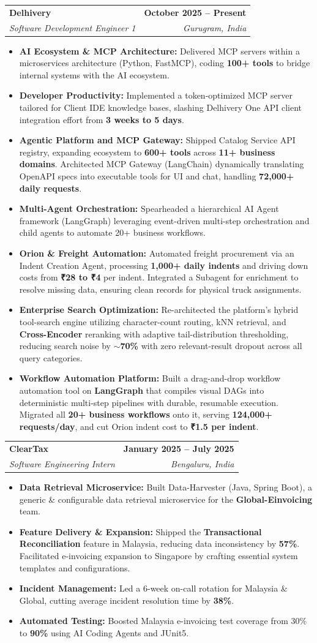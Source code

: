 \documentclass[letterpaper,11pt]{article}
\makeatletter
\newcommand{\resumeItem}[1]{\item\small{{#1 \vspace{-2pt}}}}
\newcommand{\resumeSubheading}[4]{
  \vspace{-2pt}\item
  \begin{tabular*}{1.0\textwidth}[t]{l@{\extracolsep{\fill}}r}
    \textbf{#1} & \textbf{\small #2} \\
    \textit{\small#3} & \textit{\small #4} \\
  \end{tabular*}\vspace{-7pt}
}
\newcommand{\resumeItemListStart}{\begin{itemize}}
\newcommand{\resumeItemListEnd}{\end{itemize}\vspace{-5pt}}
\makeatother
\begin{document}
  \resumeSubheading
    {Delhivery}{October 2025 -- Present}
    {Software Development Engineer 1}{Gurugram, India}
    \vspace{-7pt}
    \resumeItemListStart
      \resumeItem{\textbf{AI Ecosystem \& MCP Architecture:} Delivered MCP servers within a microservices architecture (Python, FastMCP), coding \textbf{100+ tools} to bridge internal systems with the AI ecosystem.}
      \resumeItem{\textbf{Developer Productivity:} Implemented a token-optimized MCP server tailored for Client IDE knowledge bases, slashing Delhivery One API client integration effort from \textbf{3 weeks to 5 days}.}
      \resumeItem{\textbf{Agentic Platform and MCP Gateway:} Shipped Catalog Service API registry, expanding ecosystem to \textbf{600+ tools} across \textbf{11+ business domains}. Architected MCP Gateway (LangChain) dynamically translating OpenAPI specs into executable tools for UI and chat, handling \textbf{72,000+ daily requests}.}
      \resumeItem{\textbf{Multi-Agent Orchestration:} Spearheaded a hierarchical AI Agent framework (LangGraph) leveraging event-driven multi-step orchestration and child agents to automate 20+ business workflows.}
      \resumeItem{\textbf{Orion \& Freight Automation:} Automated freight procurement via an Indent Creation Agent, processing \textbf{1,000+ daily indents} and driving down costs from \textbf{₹28 to ₹4} per indent. Integrated a Subagent for enrichment to resolve missing data, ensuring clean records for physical truck assignments.}
      \resumeItem{\textbf{Enterprise Search Optimization:} Re-architected the platform's hybrid tool-search engine utilizing character-count routing, kNN retrieval, and \textbf{Cross-Encoder} reranking with adaptive tail-distribution thresholding, reducing search noise by \textbf{$\sim$70\%} with zero relevant-result dropout across all query categories.}
      \resumeItem{\textbf{Workflow Automation Platform:} Built a drag-and-drop workflow automation tool on \textbf{LangGraph} that compiles visual DAGs into deterministic multi-step pipelines with durable, resumable execution. Migrated all \textbf{20+ business workflows} onto it, serving \textbf{124,000+ requests/day}, and cut Orion indent cost to \textbf{₹1.5 per indent}.}
    \resumeItemListEnd

  \resumeSubheading
    {ClearTax}{January 2025 -- July 2025}
    {Software Engineering Intern}{Bengaluru, India}
    \vspace{-7pt}
    \resumeItemListStart
      \resumeItem{\textbf{Data Retrieval Microservice:} Built Data-Harvester (Java, Spring Boot), a generic \& configurable data retrieval microservice for the \textbf{Global-Einvoicing} team.}
      \resumeItem{\textbf{Feature Delivery \& Expansion:} Shipped the \textbf{Transactional Reconciliation} feature in Malaysia, reducing data inconsistency by \textbf{57\%}. Facilitated e-invoicing expansion to Singapore by crafting essential system templates and configurations.}
      \resumeItem{\textbf{Incident Management:} Led a 6-week on-call rotation for Malaysia \& Global, cutting average incident resolution time by \textbf{38\%}.}
      \resumeItem{\textbf{Automated Testing:} Boosted Malaysia e-invoicing test coverage from 30\% to \textbf{90\%} using AI Coding Agents and JUnit5.}
    \resumeItemListEnd
\end{document}
